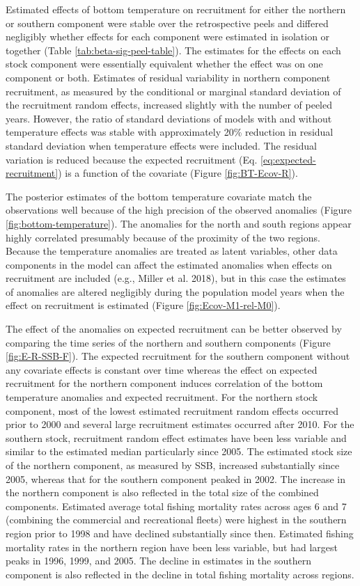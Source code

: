 \documentclass[
]{article}
\begin{document}
Estimated effects of bottom temperature on recruitment for either the
northern or southern component were stable over the retrospective peels
and differed negligibly whether effects for each component were
estimated in isolation or together (Table
\ref{tab:beta-sig-peel-table}). The estimates for the effects on each
stock component were essentially equivalent whether the effect was on
one component or both. Estimates of residual variability in northern
component recruitment, as measured by the conditional or marginal
standard deviation of the recruitment random effects, increased slightly
with the number of peeled years. However, the ratio of standard
deviations of models with and without temperature effects was stable
with approximately 20\% reduction in residual standard deviation when
temperature effects were included. The residual variation is reduced
because the expected recruitment (Eq. \ref{eq:expected-recruitment}) is
a function of the covariate (Figure \ref{fig:BT-Ecov-R}).

The posterior estimates of the bottom temperature covariate match the
observations well because of the high precision of the observed
anomalies (Figure \ref{fig:bottom-temperature}). The anomalies for the
north and south regions appear highly correlated presumably because of
the proximity of the two regions. Because the temperature anomalies are
treated as latent variables, other data components in the model can
affect the estimated anomalies when effects on recruitment are included
(e.g., Miller et al. 2018), but in this case the estimates of anomalies
are altered negligibly during the population model years when the effect
on recruitment is estimated (Figure \ref{fig:Ecov-M1-rel-M0}).

The effect of the anomalies on expected recruitment can be better
observed by comparing the time series of the northern and southern
components (Figure \ref{fig:E-R-SSB-F}). The expected recruitment for
the southern component without any covariate effects is constant over
time whereas the effect on expected recruitment for the northern
component induces correlation of the bottom temperature anomalies and
expected recruitment. For the northern stock component, most of the
lowest estimated recruitment random effects occurred prior to 2000 and
several large recruitment estimates occurred after 2010. For the
southern stock, recruitment random effect estimates have been less
variable and similar to the estimated median particularly since 2005.
The estimated stock size of the northern component, as measured by SSB,
increased substantially since 2005, whereas that for the southern
component peaked in 2002. The increase in the northern component is also
reflected in the total size of the combined components. Estimated
average total fishing mortality rates across ages 6 and 7 (combining the
commercial and recreational fleets) were highest in the southern region
prior to 1998 and have declined substantially since then. Estimated
fishing mortality rates in the northern region have been less variable,
but had largest peaks in 1996, 1999, and 2005. The decline in estimates
in the southern component is also reflected in the decline in total
fishing mortality across regions.
\end{document}
